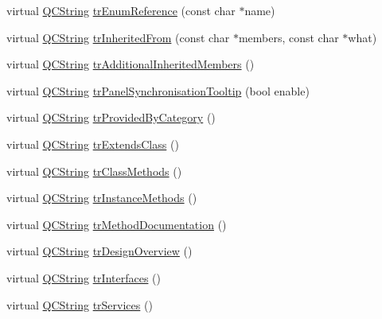 \begin{DoxyCompactItemize}
\item 
virtual \mbox{\hyperlink{class_q_c_string}{Q\+C\+String}} \mbox{\hyperlink{class_translator_german_ad018b4fccab9a1c57d5567774f155083}{tr\+Enum\+Reference}} (const char $\ast$name)
\item 
virtual \mbox{\hyperlink{class_q_c_string}{Q\+C\+String}} \mbox{\hyperlink{class_translator_german_af3678ca0b6cf674a45bd666bbce9d344}{tr\+Inherited\+From}} (const char $\ast$members, const char $\ast$what)
\item 
virtual \mbox{\hyperlink{class_q_c_string}{Q\+C\+String}} \mbox{\hyperlink{class_translator_german_a289ea8b81cae78f0584ddf5a716522ec}{tr\+Additional\+Inherited\+Members}} ()
\item 
virtual \mbox{\hyperlink{class_q_c_string}{Q\+C\+String}} \mbox{\hyperlink{class_translator_german_af2a278ea9f46f9e140f0e6f26180eff5}{tr\+Panel\+Synchronisation\+Tooltip}} (bool enable)
\item 
virtual \mbox{\hyperlink{class_q_c_string}{Q\+C\+String}} \mbox{\hyperlink{class_translator_german_a3b0f0724e19d5adca9edd52fff79f341}{tr\+Provided\+By\+Category}} ()
\item 
virtual \mbox{\hyperlink{class_q_c_string}{Q\+C\+String}} \mbox{\hyperlink{class_translator_german_a6c9ec7a1d0ca7960b780aec8776c7783}{tr\+Extends\+Class}} ()
\item 
virtual \mbox{\hyperlink{class_q_c_string}{Q\+C\+String}} \mbox{\hyperlink{class_translator_german_af5ee36dafc3d3c45e894a8b6dbab9011}{tr\+Class\+Methods}} ()
\item 
virtual \mbox{\hyperlink{class_q_c_string}{Q\+C\+String}} \mbox{\hyperlink{class_translator_german_a2eb5ae984194c1abae2b5c81aa8f2f7e}{tr\+Instance\+Methods}} ()
\item 
virtual \mbox{\hyperlink{class_q_c_string}{Q\+C\+String}} \mbox{\hyperlink{class_translator_german_a34d26545a7d053cefeb7dbb60ec6282d}{tr\+Method\+Documentation}} ()
\item 
virtual \mbox{\hyperlink{class_q_c_string}{Q\+C\+String}} \mbox{\hyperlink{class_translator_german_aabb0798fc4f61a997152d4d9ff943991}{tr\+Design\+Overview}} ()
\item 
virtual \mbox{\hyperlink{class_q_c_string}{Q\+C\+String}} \mbox{\hyperlink{class_translator_german_a9fc0ad1d0d44872be880cfa290045741}{tr\+Interfaces}} ()
\item 
virtual \mbox{\hyperlink{class_q_c_string}{Q\+C\+String}} \mbox{\hyperlink{class_translator_german_a3fb9881a750d81d7aed4642366aef532}{tr\+Services}} ()
\item 

\end{DoxyCompactItemize}

